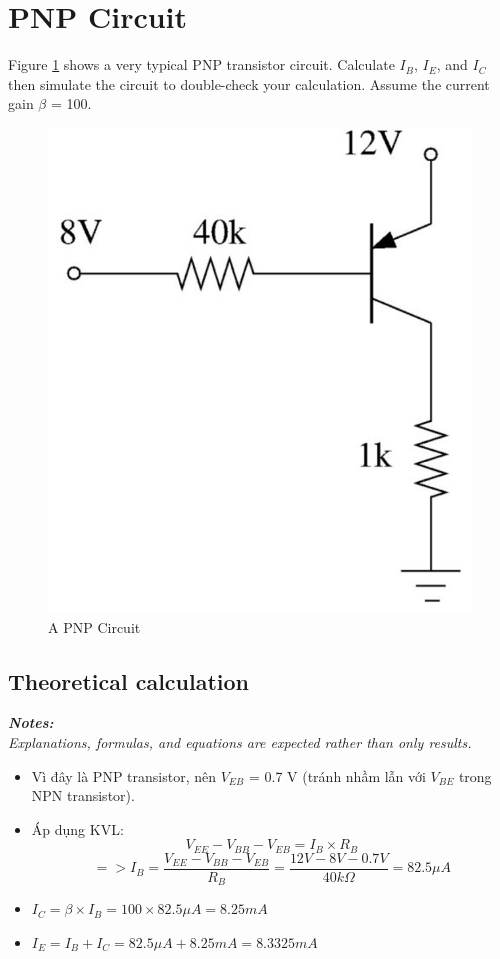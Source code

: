 \section{PNP Circuit}
Figure \ref{lab3_ex6_de} shows a very typical PNP transistor circuit.
Calculate $I_B$, $I_E$, and $I_C$ then simulate the circuit to double-check your calculation. Assume the current gain $\beta$ = 100.

\begin{figure}[H]
    \centering
    \includegraphics[width=0.5\linewidth]{graphics/ex6/f1.png}
    \caption{A PNP Circuit}
    \label{lab3_ex6_de}
\end{figure}

\subsection{Theoretical calculation}
\textit{\textbf{Notes:}}\\
\textit{Explanations, formulas, and equations are expected rather than only results.}

\begin{itemize}
    \item Vì đây là PNP transistor, nên $V_{EB}$ = 0.7 V (tránh nhầm lẫn với $V_{BE}$ trong NPN transistor).
    \item Áp dụng KVL: $$V_{EE} - V_{BB} - V_{EB} = I_B \times R_B $$
    $$ => I_B = \frac{V_{EE} - V_{BB} - V_{EB}}{R_B} = \frac{12V - 8V - 0.7V}{40k \Omega} = 82.5 \mu A $$
    \item $I_C = \beta \times I_B = 100 \times 82.5 \mu A = 8.25 mA $
    \item $I_E = I_B + I_C = 82.5\mu A + 8.25mA = 8.3325 mA$
\end{itemize}

